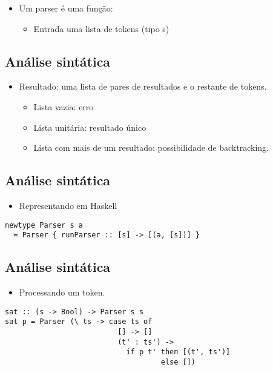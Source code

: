 \documentclass[11pt]{article}
\begin{document}
\begin{itemize}
\item Um parser é uma função:
\begin{itemize}
\item Entrada uma lista de tokens (tipo s)
\end{itemize}
\end{itemize}
\subsection*{Análise sintática}
\label{sec:orga333b88}
\begin{itemize}
\item Resultado: uma lista de pares de resultados e o restante de tokens. 
\begin{itemize}
\item Lista vazia: erro
\item Lista unitária: resultado único
\item Lista com mais de um resultado: possibilidade de backtracking.
\end{itemize}
\end{itemize}
\subsection*{Análise sintática}
\label{sec:orgdb47729}

\begin{itemize}
\item Representando em Haskell
\end{itemize}

\begin{verbatim}
newtype Parser s a 
  = Parser { runParser :: [s] -> [(a, [s])] }
\end{verbatim}
\subsection*{Análise sintática}
\label{sec:org1321625}

\begin{itemize}
\item Processando um token.
\end{itemize}

\begin{verbatim}
sat :: (s -> Bool) -> Parser s s
sat p = Parser (\ ts -> case ts of 
                          [] -> [] 
                          (t' : ts') -> 
                            if p t' then [(t', ts')] 
                                    else [])
\end{verbatim}
\end{document}
